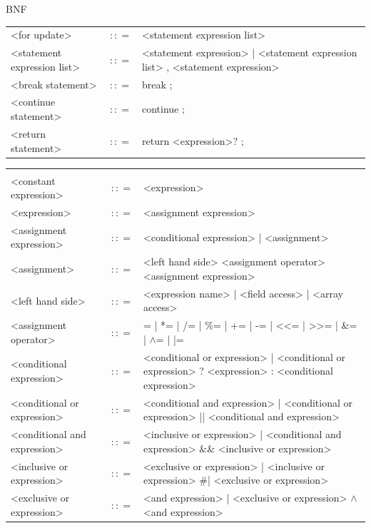\documentclass[landscape, 11pt]{article}
\begin{document}
\begin{qsection}{BNF}
\begin{enumerate}[label=\bt{\theenumi.}]
\begin{longtable}{R{7cm} c L{15cm}}
				<for update>								&	$\colon\colon=$	&	<statement expression list>
				\\
				<statement expression list>					&	$\colon\colon=$	&	<statement expression> | <statement expression list> , <statement expression>
				\\
				<break statement>							&	$\colon\colon=$	&	break ;
				\\
				<continue statement>						&	$\colon\colon=$	&	continue ;
				\\
				<return statement>							&	$\colon\colon=$	&	return <expression>? ;
			\end{longtable}


			\begin{longtable}{R{7cm} c L{15cm}}
													&					&	 \\
				<constant expression>						&	$\colon\colon=$	&	<expression>
				\\
				<expression>								&	$\colon\colon=$	&	<assignment expression>
				\\
				<assignment expression>						&	$\colon\colon=$	&	<conditional expression> | <assignment>
				\\
				<assignment>								&	$\colon\colon=$	&	<left hand side> <assignment operator> <assignment expression>
				\\
				<left hand side>							&	$\colon\colon=$	&	<expression name> | <field access> | <array access>
				\\
				<assignment operator>						&	$\colon\colon=$	&	= | *= | /= | \%= | += | -= | <<= | >>= | \&= | $\wedge$= | |=
				\\
				<conditional expression>					&	$\colon\colon=$	&	<conditional or expression> | <conditional or expression> ? <expression> : <conditional expression>
				\\
				<conditional or expression>					&	$\colon\colon=$	&	<conditional and expression> | <conditional or expression> || <conditional and expression>
				\\
				<conditional and expression>				&	$\colon\colon=$	&	<inclusive or expression> | <conditional and expression> \&\& <inclusive or expression>
				\\
				<inclusive or expression>					&	$\colon\colon=$	&	<exclusive or expression> | <inclusive or expression> \#| <exclusive or expression>
				\\
				<exclusive or expression>					&	$\colon\colon=$	&	<and expression> | <exclusive or expression> $\wedge$ <and expression>

\end{longtable}
\end{enumerate}
\end{qsection}
\end{document}

